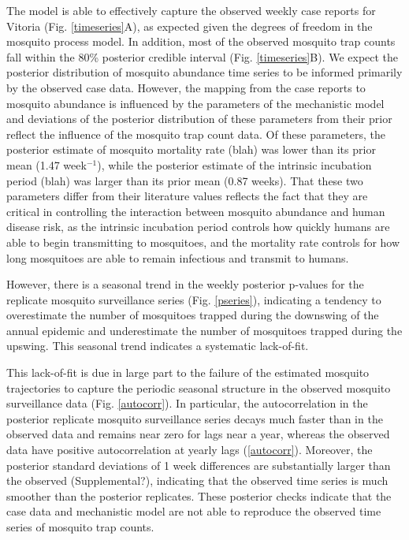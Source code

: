 \documentclass[10pt,letterpaper]{article}
\begin{document}
The model is able to effectively capture the observed weekly case reports for Vitoria (Fig. \ref{timeseries}A), as expected given the degrees of freedom in the mosquito process model.
In addition, most of the observed mosquito trap counts fall within the 80\% posterior credible interval (Fig. \ref{timeseries}B).
We expect the posterior distribution of mosquito abundance time series to be informed primarily by the observed case data.
However, the mapping from the case reports to mosquito abundance is influenced by the parameters of the mechanistic model and deviations of the posterior distribution of these parameters from their prior reflect the influence of the mosquito trap count data.
Of these parameters, the posterior estimate of mosquito mortality rate (blah) was lower than its prior mean (1.47 week$^{-1}$), while the posterior estimate of the intrinsic incubation period (blah) was larger than its prior mean (0.87 weeks).
That these two parameters differ from their literature values reflects the fact that they are critical in controlling the interaction between mosquito abundance and human disease risk, as the intrinsic incubation period controls how quickly humans are able to begin transmitting to mosquitoes, and the mortality rate controls for how long mosquitoes are able to remain infectious and transmit to humans.

However, there is a seasonal trend in the weekly posterior p-values for the replicate mosquito surveillance series (Fig. \ref{pseries}), indicating a tendency to overestimate the number of mosquitoes trapped during the downswing of the annual epidemic and underestimate the number of mosquitoes trapped during the upswing. 
This seasonal trend indicates a systematic lack-of-fit.

This lack-of-fit is due in large part to the failure of the estimated mosquito trajectories to capture the periodic seasonal structure in the observed mosquito surveillance data (Fig. \ref{autocorr}).
In particular, the autocorrelation in the posterior replicate mosquito surveillance series decays much faster than in the observed data and remains near zero for lags near a year, whereas the observed data have positive autocorrelation at yearly lags (\ref{autocorr}).
Moreover, the posterior standard deviations of 1 week differences are substantially larger than the observed (Supplemental?), indicating that the observed time series is much smoother than the posterior replicates.
These posterior checks indicate that the case data and mechanistic model are not able to reproduce the observed time series of mosquito trap counts.
\end{document}
